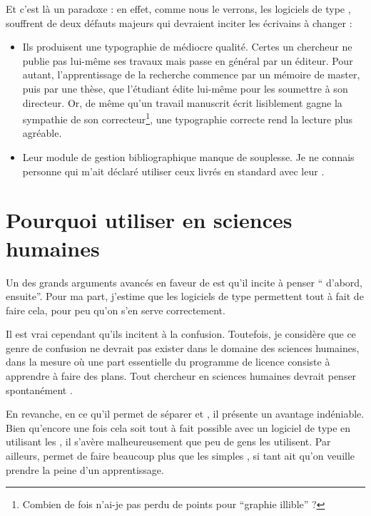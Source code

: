 Et c'est là un paradoxe : en effet, comme nous le verrons, les logiciels de type , souffrent de deux défauts majeurs qui devraient inciter les écrivains à changer :
\begin{itemize}
\item Ils produisent une typographie de médiocre qualité. Certes un chercheur ne publie pas lui-même ses travaux mais passe en général par un éditeur. Pour autant, l'apprentissage de la recherche commence par un mémoire de master, puis par une thèse, que l'étudiant édite lui-même pour les soumettre à son directeur. Or, de même qu'un travail manuscrit écrit lisiblement gagne la sympathie de son correcteur\footnote{Combien de fois n'ai-je pas perdu de points pour \enquote{graphie illible} ?},  une typographie correcte rend la lecture plus agréable.
\item Leur module de gestion bibliographique manque de souplesse. Je ne connais personne qui m'ait déclaré utiliser ceux livrés en standard avec leur .
\end{itemize}

\section{Pourquoi utiliser  en sciences humaines}

Un des grands arguments avancés en faveur de \concept{\LaTeX} est qu'il incite à penser \enquote{ d'abord,  ensuite}. Pour ma part, j'estime que les logiciels de type  permettent tout à fait de faire cela, pour peu qu'on s'en serve correctement. 

Il est vrai cependant qu'ils incitent à la confusion. Toutefois, je considère que ce genre de confusion ne devrait pas exister dans le domaine des sciences humaines, dans la mesure où une part essentielle du programme de licence consiste à apprendre à faire des plans. Tout chercheur en sciences humaines devrait penser spontanément .

En revanche, en ce qu'il permet de séparer  et , il présente un avantage indéniable. Bien qu'encore une fois cela soit tout à fait possible avec un logiciel de type  en utilisant les ,  il s'avère malheureusement que peu de gens les utilisent. Par ailleurs, \logiciel{\LaTeX} permet de faire beaucoup plus que les simples , si tant ait qu'on veuille prendre la peine d'un apprentissage.

